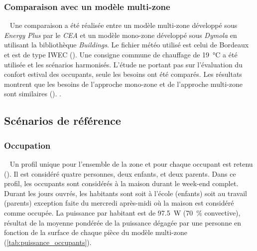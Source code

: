 \subsubsection{Comparaison avec un modèle multi-zone} %
\label{ssub:comparaison_avec_un_modele_multi_zone}
~
Une comparaison a été réalisée
entre un modèle multi-zone développé sous \textit{Energy Plus} par le
\textit{CEA} et un modèle mono-zone développé sous \textit{Dymola} en utilisant
la bibliothèque \textit{Buildings}. Le fichier météo utilisé est celui de
Bordeaux et est de type IWEC (). Une
consigne commune de chauffage de \SI{19}{\celsius} a été utilisée et les scénarios
harmonisés. L’étude ne portant pas sur l’évaluation du confort estival des
occupants, seule les besoins ont été comparés. Les résultats montrent que les
besoins de l’approche mono-zone et de l’approche multi-zone sont similaires
().
.


\subsection{Scénarios de référence} %
\label{sub:scénarios_de_référence}
\subsubsection{Occupation} %
\label{ssub:profil_d_occupation}
~
Un profil unique pour l’ensemble de la zone et pour chaque occupant est retenu (). Il est considéré quatre personnes, deux enfants, et deux parents. Dans ce profil,
les occupants sont considérés à la maison durant le week-end complet. Durant les jours
ouvrés, les habitants sont soit à l’école (enfants) soit au travail (parents) exception
faite du mercredi après-midi où la maison est considéré comme occupée.
La puissance par habitant est de \SI{97.5}{\watt} (\SI{70}{\percent} convective), résultat
de la moyenne pondérée de la puissance dégagée par une personne en fonction de la surface
de chaque pièce du modèle multi-zone (\ref{tab:puissance_occupants}).

